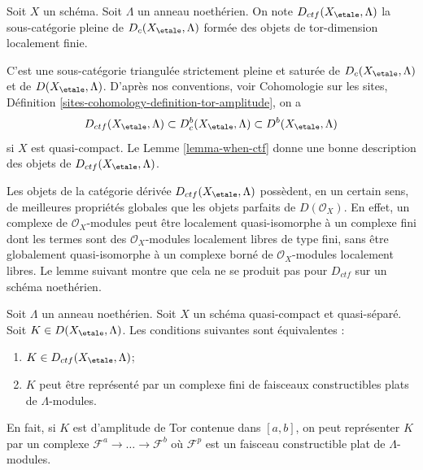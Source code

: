 \begin{definition}
\label{definition-ctf}
Soit $X$ un schéma. Soit $\Lambda$ un anneau noethérien. On note
{\it $D_{ctf}(X_\etale, \Lambda)$} la sous-catégorie pleine de
$D_c(X_\etale, \Lambda)$
formée des objets de tor-dimension localement finie.
\end{definition}

\noindent
C'est une sous-catégorie triangulée strictement pleine et saturée de
$D_c(X_\etale, \Lambda)$ et de $D(X_\etale, \Lambda)$. D'après nos conventions, voir
Cohomologie sur les sites, Définition \ref{sites-cohomology-definition-tor-amplitude},
on a
$$
D_{ctf}(X_\etale, \Lambda) \subset D^b_c(X_\etale, \Lambda)
\subset D^b(X_\etale, \Lambda)
$$
si $X$ est quasi-compact. Le Lemme \ref{lemma-when-ctf} donne une bonne
description des objets de $D_{ctf}(X_\etale, \Lambda)$.

\begin{remark}
\label{remark-different}
Les objets de la catégorie dérivée $D_{ctf}(X_\etale, \Lambda)$ possèdent, en un
certain sens, de meilleures propriétés globales que les objets parfaits de $D(\mathcal{O}_X)$.
En effet, un complexe de $\mathcal{O}_X$-modules peut être
localement quasi-isomorphe à un complexe fini dont les termes sont
des $\mathcal{O}_X$-modules localement libres de type fini, sans être
globalement quasi-isomorphe à un complexe borné de
$\mathcal{O}_X$-modules localement libres. Le lemme suivant montre que cela ne se produit pas pour
$D_{ctf}$ sur un schéma noethérien.
\end{remark}

\begin{lemma}
\label{lemma-when-ctf}
Soit $\Lambda$ un anneau noethérien. Soit $X$ un schéma quasi-compact
et quasi-séparé. Soit $K \in D(X_\etale, \Lambda)$. Les conditions suivantes
sont équivalentes :
\begin{enumerate}
\item $K \in D_{ctf}(X_\etale, \Lambda)$;
\item $K$ peut être représenté par un complexe fini de faisceaux
constructibles plats de $\Lambda$-modules.
\end{enumerate}
En fait, si $K$ est d'amplitude de Tor contenue dans $[a, b]$, on peut représenter
$K$ par un complexe $\mathcal{F}^a \to \ldots \to \mathcal{F}^b$ où
$\mathcal{F}^p$ est un faisceau constructible plat de $\Lambda$-modules.
\end{lemma}

